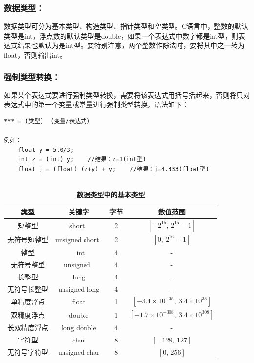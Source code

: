 \documentclass[zihao=-4,UTF8]{report}
\begin{document}
\subsubsection{数据类型：}
数据类型可分为基本类型、构造类型、指针类型和空类型。C语言中，整数的默认类型是int，浮点数的默认类型是double，如果一个表达式中数字都是int型，则表达式结果也默认为是int型。要特别注意，两个整数作除法时，要将其中之一转为float，否则输出int。
\subsubsection{强制类型转换：}
如果某个表达式要进行强制类型转换，需要将该表达式用括号括起来，否则将只对表达式中的第一个变量或常量进行强制类型转换。语法如下：
\begin{lstlisting}
*** = (类型)  (变量/表达式)

例如：
    float y = 5.0/3; 
    int z = (int) y;    //结果：z=1(int型)
    float j = (float) (z+y) + y;    //结果：j=4.333(float型)


\end{lstlisting}

\begin{table}[H]
    \caption{\textbf{数据类型中的基本类型}}
    \centering
    \begin{tabular}{cccc} 
    \toprule
    类型     & 关键字             & 字节 & 数值范围  \\
    \hline
    短整型    & short~          & 2    & $[-2^{15},\ 2^{15}-1]$      \\
    无符号短整型 & unsigned short~ & 2 &  $[0,\ 2^{16}-1]$    \\
    整型     & ~int            & 4     &  -   \\
    无符号整型  & unsigned~       & 4  &   - \\
    长整型    & long            & 4    &    -   \\
    无符号长整型 & unsigned long   & 4 &     -  \\
    单精度浮点  & float           & 1  &     $[-3.4\times 10^{-38},\ 3.4\times 10^{38}]$  \\
    双精度浮点  &  double & 1  &     $[-1.7\times 10^{-308},\ 3.4\times 10^{308}]$ \\
    长双精度浮点 & long double          & 4 &      - \\
    字符型    & char       & 8   &      $[-128,\  127]$ \\
    无符号字符型 & unsigned char     & 8 &      $[0,\ 256]$ \\
    \bottomrule
    \end{tabular}
\end{table}
\end{document}
